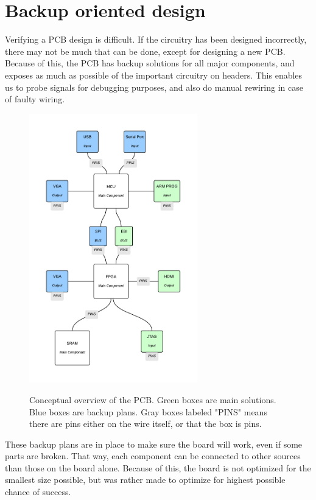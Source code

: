 \documentclass[../main/report.tex]{subfiles}
\begin{document}
\section{Backup oriented design}

Verifying a PCB design is difficult.
If the circuitry has been designed incorrectly, there may not be much that can be done, except for designing a new PCB.
Because of this, the PCB has backup solutions for all major components, and exposes as much as possible of the important circuitry on headers.
This enables us to probe signals for debugging purposes, and also do manual rewiring in case of faulty wiring.

\begin{figure}[H]
    \centering
    \includegraphics[width=0.65\textwidth]{../pcb/assets/pcb-overview.pdf}
    \label{fig:pcb-overview}
    \caption{Conceptual overview of the PCB. Green boxes are main solutions. Blue boxes are backup plans.
             Gray boxes labeled "PINS" means there are pins either on the wire itself, or that the box is pins.}
\end{figure}

These backup plans are in place to make sure the board will work, even if some parts are broken.
That way, each component can be connected to other sources than those on the board alone.
Because of this, the board is not optimized for the smallest size possible, but was rather made to optimize for highest possible chance of success.
\end{document}
